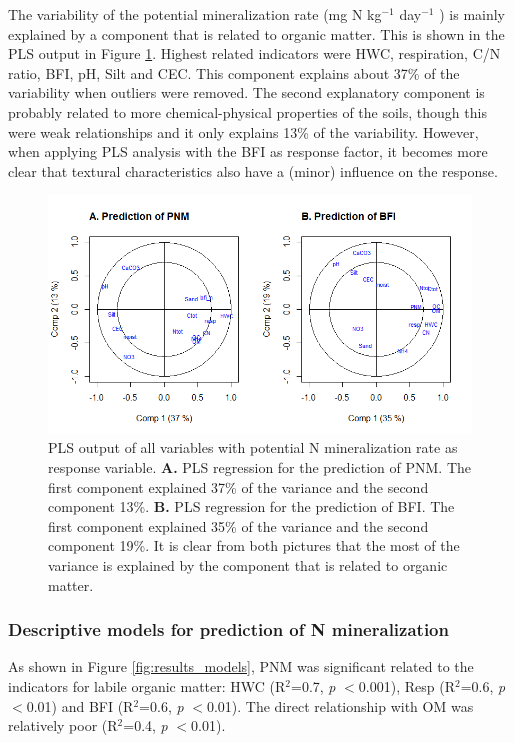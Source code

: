 \documentclass[10pt,twoside,dutch,english]{report}
\begin{document}
The variability of the potential mineralization rate (mg N kg$^{-1} $ day$^{-1}$ ) is mainly explained by a component that is related to organic matter. This is shown in the PLS output in Figure \ref{fig:results_pls}. Highest related indicators were HWC, respiration, C/N ratio, BFI, pH, Silt and CEC. This component explains about 37\% of the variability when outliers were removed. The second explanatory component is probably related to more chemical-physical properties of the soils, though this were weak relationships and it only explains 13\% of the variability. However, when applying PLS analysis with the BFI as response factor, it becomes more clear that textural characteristics also have a (minor) influence on the response. 
	\begin{figure}[ht] %
	\includegraphics[width=1\linewidth]{results_pls_pnmbfi}
	\caption{PLS output of all variables with potential N mineralization rate as response variable. \textbf{A.} PLS regression for the prediction of PNM. The first component explained 37\% of the variance and the second component 13\%. \textbf{B.} PLS regression for the prediction of BFI. The first component explained 35\% of the variance and the second component 19\%. It is clear from both pictures that the most of the variance is explained by the component that is related to organic matter.}
	\label{fig:results_pls}
\end{figure}


\subsubsection{Descriptive models for prediction of N mineralization}
As shown in Figure \ref{fig:results_models}, PNM was significant related to the indicators for labile organic matter: HWC (R$^{2}$=0.7, \textit{p} $<$0.001), Resp (R$^{2}$=0.6, \textit{p} $<$0.01) and BFI (R$^{2}$=0.6, \textit{p} $<$0.01). The direct relationship with OM was relatively poor (R$^{2}$=0.4, \textit{p} $<$0.01).
\end{document}
